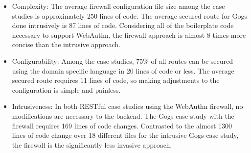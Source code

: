 \begin{itemize}[nosep]
\item Complexity: The average firewall configuration file size among the case studies is approximately 250 lines of code. The average secured route for Gogs done intrusively is 87 lines of code. Considering all of the boilerplate code necessary to support WebAuthn, the firewall approach is almost 8 times more concise than the intrusive approach.





\item Configurability: Among the case studies, 75\% of all routes can be secured using the domain specific language in 20 lines of code or less. The average secured route requires 11 lines of code, so making adjustments to the configuration is simple and painless. 


\item Intrusiveness: In both RESTful case studies using the WebAuthn firewall, no modifications are necessary to the backend. The Gogs case study with the firewall requires 169 lines of code changes. Contrasted to the almost 1300 lines of code change over 18 different files for the intrusive Gogs case study, the firewall is the significantly less invasive approach.


\end{itemize}

